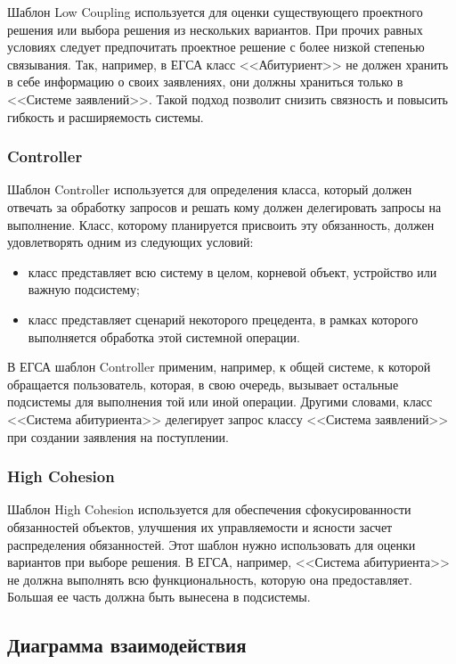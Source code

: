 \documentclass[a4paper, 14pt]{extarticle}
\begin{document}
Шаблон Low Coupling используется для оценки существующего проектного решения или
выбора решения из нескольких вариантов. При прочих равных условиях следует
предпочитать проектное решение с более низкой степенью связывания. Так,
например, в ЕГСА класс <<Абитуриент>> не должен хранить в себе информацию о
своих заявлениях, они должны храниться только в <<Системе заявлений>>. Такой
подход позволит снизить связность и повысить гибкость и расширяемость системы.

\subsubsection*{Controller}

Шаблон Controller используется для определения класса, который должен отвечать
за обработку запросов и решать кому должен делегировать запросы на выполнение.
Класс, которому планируется присвоить эту обязанность, должен удовлетворять
одним из следующих условий:
\begin{itemize}
  \item класс представляет всю систему в целом, корневой объект, устройство или
  важную подсистему;
  \item класс представляет сценарий некоторого прецедента, в рамках которого
  выполняется обработка этой системной операции.
\end{itemize}
В ЕГСА шаблон Controller применим, например, к общей системе, к которой
обращается пользователь, которая, в свою очередь, вызывает остальные подсистемы
для выполнения той или иной операции. Другими словами, класс <<Система
абитуриента>> делегирует запрос классу <<Система заявлений>> при создании
заявления на поступлении.

\subsubsection*{High Cohesion}

Шаблон High Cohesion используется для обеспечения сфокусированности обязанностей
объектов, улучшения их управляемости и ясности засчет распределения
обязанностей. Этот шаблон нужно использовать для оценки вариантов при выборе
решения. В ЕГСА, например, <<Система абитуриента>> не должна выполнять всю
функциональность, которую она предоставляет. Большая ее часть должна быть
вынесена в подсистемы.

\subsection{Диаграмма взаимодействия}
\end{document}
